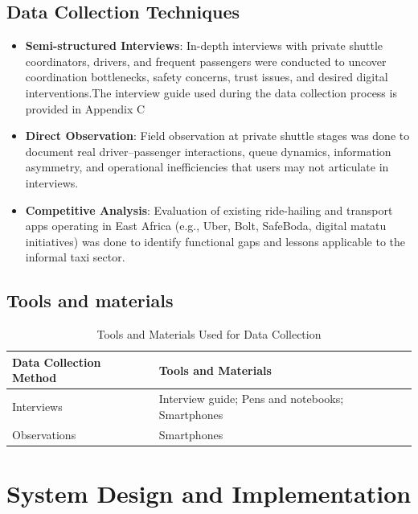 \subsection{Data Collection Techniques}

\begin{itemize}

 \item \textbf{Semi-structured Interviews}: In-depth interviews with
        private shuttle coordinators, drivers, and frequent passengers were
        conducted to uncover coordination bottlenecks, safety concerns, trust
        issues, and desired digital interventions.The interview guide used during the data collection process is provided in Appendix C

 \item \textbf{Direct Observation}: Field observation at private shuttle
        stages was done to document real driver–passenger interactions, queue
        dynamics, information asymmetry, and operational inefficiencies that
        users may not articulate in interviews.

 \item \textbf{Competitive Analysis}: Evaluation of existing ride-hailing
        and transport apps operating in East Africa (e.g., Uber, Bolt, SafeBoda,
        digital matatu initiatives) was done to identify functional gaps and
        lessons applicable to the informal taxi sector.
\end{itemize}

\subsection{Tools and materials}

\begin{table}[h!]
\centering
\begin{tabular}{|l|l|}
\hline

\textbf{Data Collection Method} & \textbf{Tools and Materials} \\ \hline
Interviews & Interview guide; Pens and notebooks; Smartphones \\ \hline
Observations & Smartphones \\ \hline

\end{tabular}
\caption{Tools and Materials Used for Data Collection}
\end{table}

\section{System Design and Implementation}


